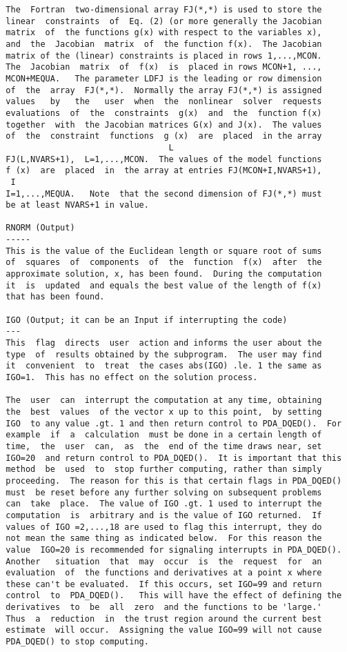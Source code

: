 \begin{verbatim}
  The  Fortran  two-dimensional array FJ(*,*) is used to store the
  linear  constraints  of  Eq. (2) (or more generally the Jacobian
  matrix  of  the functions g(x) with respect to the variables x),
  and  the  Jacobian  matrix  of  the function f(x).  The Jacobian
  matrix of the (linear) constraints is placed in rows 1,...,MCON.
  The  Jacobian  matrix  of  f(x)  is  placed in rows MCON+1, ...,
  MCON+MEQUA.   The parameter LDFJ is the leading or row dimension
  of  the  array  FJ(*,*).  Normally the array FJ(*,*) is assigned
  values   by   the   user  when  the  nonlinear  solver  requests
  evaluations  of  the  constraints  g(x)  and  the  function f(x)
  together  with  the Jacobian matrices G(x) and J(x).  The values
  of  the  constraint  functions  g (x)  are  placed  in the array
                                   L
  FJ(L,NVARS+1),  L=1,...,MCON.  The values of the model functions
  f (x)  are  placed  in  the array at entries FJ(MCON+I,NVARS+1),
   I
  I=1,...,MEQUA.   Note  that the second dimension of FJ(*,*) must
  be at least NVARS+1 in value.

  RNORM (Output)
  -----
  This is the value of the Euclidean length or square root of sums
  of  squares  of  components  of  the  function  f(x)  after  the
  approximate solution, x, has been found.  During the computation
  it  is  updated  and equals the best value of the length of f(x)
  that has been found.

  IGO (Output; it can be an Input if interrupting the code)
  ---
  This  flag  directs  user  action and informs the user about the
  type  of  results obtained by the subprogram.  The user may find
  it  convenient  to  treat  the cases abs(IGO) .le. 1 the same as
  IGO=1.  This has no effect on the solution process.

  The  user  can  interrupt the computation at any time, obtaining
  the  best  values  of the vector x up to this point,  by setting
  IGO  to any value .gt. 1 and then return control to PDA_DQED().  For
  example  if  a  calculation  must be done in a certain length of
  time,  the  user  can,  as  the  end of the time draws near, set
  IGO=20  and return control to PDA_DQED().  It is important that this
  method  be  used  to  stop further computing, rather than simply
  proceeding.  The reason for this is that certain flags in PDA_DQED()
  must  be reset before any further solving on subsequent problems
  can  take  place.  The value of IGO .gt. 1 used to interrupt the
  computation  is  arbitrary and is the value of IGO returned.  If
  values of IGO =2,...,18 are used to flag this interrupt, they do
  not mean the same thing as indicated below.  For this reason the
  value  IGO=20 is recommended for signaling interrupts in PDA_DQED().
  Another   situation  that  may  occur  is  the  request  for  an
  evaluation  of  the functions and derivatives at a point x where
  these can't be evaluated.  If this occurs, set IGO=99 and return
  control  to  PDA_DQED().   This will have the effect of defining the
  derivatives  to  be  all  zero  and the functions to be 'large.'
  Thus  a  reduction  in  the trust region around the current best
  estimate  will occur.  Assigning the value IGO=99 will not cause
  PDA_DQED() to stop computing.


\end{verbatim}
